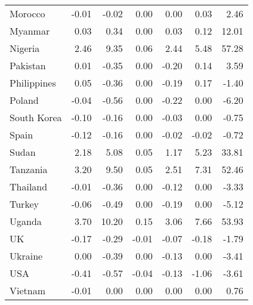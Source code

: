 \begin{table}[b]
\begin{tabular}[t]{lrrrrrr}
Morocco & -0.01 & -0.02 & 0.00 & 0.00 & 0.03 & 2.46\\
Myanmar & 0.03 & 0.34 & 0.00 & 0.03 & 0.12 & 12.01\\
Nigeria & 2.46 & 9.35 & 0.06 & 2.44 & 5.48 & 57.28\\
Pakistan & 0.01 & -0.35 & 0.00 & -0.20 & 0.14 & 3.59\\
Philippines & 0.05 & -0.36 & 0.00 & -0.19 & 0.17 & -1.40\\
Poland & -0.04 & -0.56 & 0.00 & -0.22 & 0.00 & -6.20\\
South Korea & -0.10 & -0.16 & 0.00 & -0.03 & 0.00 & -0.75\\
Spain & -0.12 & -0.16 & 0.00 & -0.02 & -0.02 & -0.72\\
Sudan & 2.18 & 5.08 & 0.05 & 1.17 & 5.23 & 33.81\\
Tanzania & 3.20 & 9.50 & 0.05 & 2.51 & 7.31 & 52.46\\
Thailand & -0.01 & -0.36 & 0.00 & -0.12 & 0.00 & -3.33\\
Turkey & -0.06 & -0.49 & 0.00 & -0.19 & 0.00 & -5.12\\
Uganda & 3.70 & 10.20 & 0.15 & 3.06 & 7.66 & 53.93\\
UK & -0.17 & -0.29 & -0.01 & -0.07 & -0.18 & -1.79\\
Ukraine & 0.00 & -0.39 & 0.00 & -0.13 & 0.00 & -3.41\\
USA & -0.41 & -0.57 & -0.04 & -0.13 & -1.06 & -3.61\\
Vietnam & -0.01 & 0.00 & 0.00 & 0.00 & 0.00 & 0.76\\
\bottomrule
\end{tabular}
\end{table}